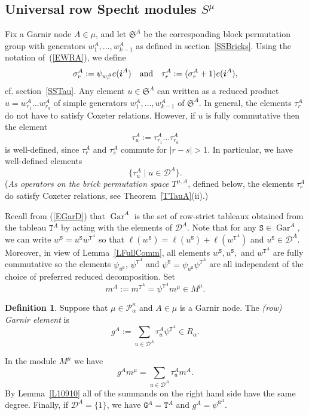 \documentclass[twoside,11pt,reqno]{amsart}
\numberwithin{equation}{section}
\theoremstyle{definition}  %
\newtheorem{Definition}[equation]{Definition}
\def\bi{\text{\boldmath$i$}}
\newcommand{\Stab}{\operatorname{Stab}}
\newcommand{\0}{{\bar 0}}
\newcommand{\1}{{\bar 1}}
\newcommand{\al}{\alpha}
\def\Si{\mathfrak{S}}
\newcommand{\si}{\sigma}
\newcommand{\D}{{\mathscr D}}
\newcommand\Par[1][]{{\mathscr P}^{\kappa#1}}
\def\T{{\mathtt T}}
\def\Stab{{\mathtt S}}
\def\G{{\mathtt G}}
\def\Gar{{\operatorname{Gar}}}
\begin{document}
\subsection{\boldmath Universal row Specht modules $S^\mu$}

Fix a Garnir node $A\in\mu$, and let $\Si^A$ be the corresponding block permutation group with
generators $w_1^A,\dots,w_{k-1}^A$ as defined in section~\ref{SSBricks}. Using the notation of~(\ref{EWRA}), we define 
\begin{equation}\label{ESiTauA}
\si_r^A:=\psi_{w_r^A}e(\bi^A)\quad\text{and}\quad \tau_r^A:=(\si_r^A+1)e(\bi^A),
\end{equation}
cf. section~\ref{SSTau}.
Any element $u\in\Si^A$ can written as a reduced product $u=w_{r_1}^A\dots w_{r_a}^A$ of simple generators $w_1^A,\dots,w_{k-1}^A$ of $\Si^A$. 
In general, the elements $\tau_r^A$ do not have to satisfy Coxeter relations. However, if $u$ is fully commutative then the element
$$
\tau_u^A:=\tau_{r_1}^A\dots \tau_{r_a}^A
$$
is well-defined, since $\tau_r^A$ and $\tau_s^A$ commute for $|r-s|>1$. 
In particular, we have well-defined elements 
$$
\{\tau_u^A\mid u\in \D^A\}.
$$
({\em As  operators on the brick permutation space $T^{\mu,A}$}, defined below, the elements $\tau_r^A$ do satisfy Coxeter relations, see Theorem~\ref{TTauA}(ii).)   


Recall from
(\ref{EGarD}) that $\Gar^A$ is the set of row-strict tableaux obtained from the tableau $\T^A$
by acting with the elements of $\D^A$. Note that for any $\Stab\in\Gar^A$,
we can write $w^\Stab=u^\Stab w^{\T^A}$ so that $\ell(w^\Stab)=\ell(u^\Stab)+\ell(w^{\T^A})$
and $u^\Stab\in\D^A$. Moreover, in view of Lemma~\ref{LFullComm}, all elements
$w^\Stab,u^\Stab,$ and $w^{\T^A}$ are fully commutative so the elements
$\psi_{u^\Stab}$, $\psi^{\T^A}$ and
$\psi^\Stab=\psi_{u^\Stab}\psi^{\T^A}$ are all independent of the choice of preferred reduced
decomposition.
Set 
$$
m^A:=m^{\T^A}=\psi^{\T^A}m^\mu\in M^\mu. %
$$


\begin{Definition}%
Suppose that $\mu\in\Par_\al$ and $A\in\mu$ is a Garnir node. The {\em (row) Garnir element} is  
$$
g^A:=%
\sum_{u\in\D^A}\tau_u^A\psi^{\T^A}\in R_\al.%
$$
\end{Definition}

In the module $M^\mu$ we have 
$$g^Am^\mu=\sum_{u\in\D^A}\tau_u^Am^A.$$ 
By Lemma~\ref{L10910} all of the summands on the right hand side have the same degree.  
Finally, if $\D^A=\{1\}$, we have $\G^A=\T^A$ and $g^A=\psi^{\G^A}$. 
\end{document}
